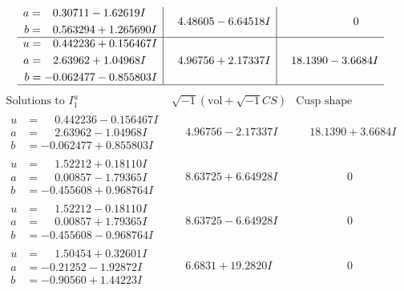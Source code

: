\documentclass[1p]{elsarticle_modified}
\theoremstyle{definition}
\newcommand{\I}{\sqrt{-1}}
\begin{document}
$$\begin{array}{c|c|c}
\begin{aligned}
a &= \phantom{-}0.30711 - 1.62619 I \\
b &= \phantom{-}0.563294 + 1.265690 I\end{aligned}
 & \phantom{-}4.48605 - 6.64518 I & \phantom{-0.000000 } 0 \\ \hline\begin{aligned}
u &= \phantom{-}0.442236 + 0.156467 I \\
a &= \phantom{-}2.63962 + 1.04968 I \\
b &= -0.062477 - 0.855803 I\end{aligned}
 & \phantom{-}4.96756 + 2.17337 I & \phantom{-}18.1390 - 3.6684 I\\
 \hline 
 \end{array}$$\newpage$$\begin{array}{c|c|c}  
\text{Solutions to }I^u_{1}& \I (\text{vol} + \sqrt{-1}CS) & \text{Cusp shape}\\
 \hline 
\begin{aligned}
u &= \phantom{-}0.442236 - 0.156467 I \\
a &= \phantom{-}2.63962 - 1.04968 I \\
b &= -0.062477 + 0.855803 I\end{aligned}
 & \phantom{-}4.96756 - 2.17337 I & \phantom{-}18.1390 + 3.6684 I \\ \hline\begin{aligned}
u &= \phantom{-}1.52212 + 0.18110 I \\
a &= \phantom{-}0.00857 - 1.79365 I \\
b &= -0.455608 + 0.968764 I\end{aligned}
 & \phantom{-}8.63725 + 6.64928 I & \phantom{-0.000000 } 0 \\ \hline\begin{aligned}
u &= \phantom{-}1.52212 - 0.18110 I \\
a &= \phantom{-}0.00857 + 1.79365 I \\
b &= -0.455608 - 0.968764 I\end{aligned}
 & \phantom{-}8.63725 - 6.64928 I & \phantom{-0.000000 } 0 \\ \hline\begin{aligned}
u &= \phantom{-}1.50454 + 0.32601 I \\
a &= -0.21252 - 1.92872 I \\
b &= -0.90560 + 1.44223 I\end{aligned}
 & \phantom{-}6.6831 + 19.2820 I & \phantom{-0.000000 } 0 \\ \hline\begin{aligned}

\end{aligned}
\end{array}$$
\end{document}
